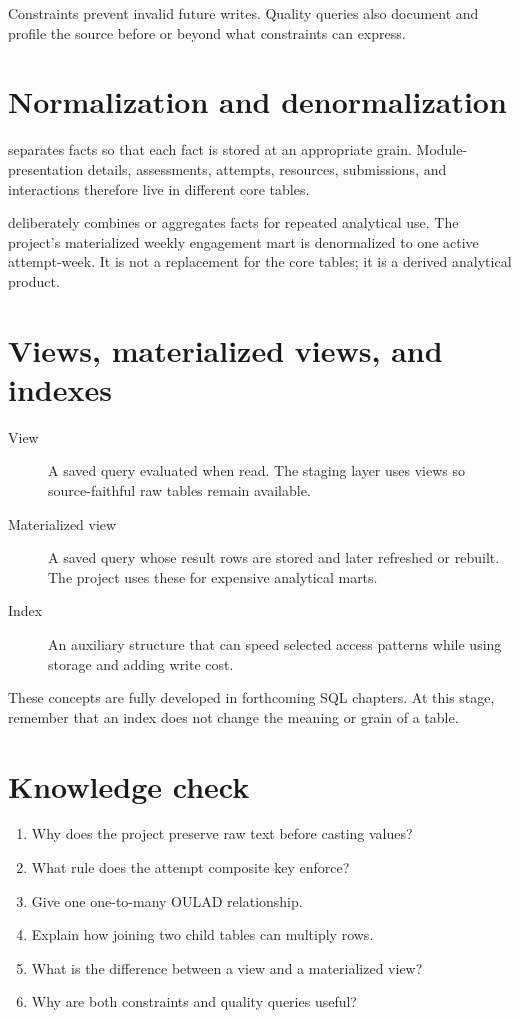 Constraints prevent invalid future writes. Quality queries also document and
profile the source before or beyond what constraints can express.

\section{Normalization and denormalization}

 separates facts so that each fact is stored at an
appropriate grain. Module-presentation details, assessments, attempts,
resources, submissions, and interactions therefore live in different core
tables.

 deliberately combines or aggregates facts for repeated
analytical use. The project's materialized weekly engagement mart is
denormalized to one active attempt-week. It is not a replacement for the core
tables; it is a derived analytical product.

\section{Views, materialized views, and indexes}

\begin{description}
  \item[View] A saved query evaluated when read. The staging layer uses views so
    source-faithful raw tables remain available.
  \item[Materialized view] A saved query whose result rows are stored and later
    refreshed or rebuilt. The project uses these for expensive analytical
    marts.
  \item[Index] An auxiliary structure that can speed selected access patterns
    while using storage and adding write cost.
\end{description}

These concepts are fully developed in forthcoming SQL chapters. At this stage,
remember that an index does not change the meaning or grain of a table.

\section{Knowledge check}

\begin{enumerate}
  \item Why does the project preserve raw text before casting values?
  \item What rule does the attempt composite key enforce?
  \item Give one one-to-many OULAD relationship.
  \item Explain how joining two child tables can multiply rows.
  \item What is the difference between a view and a materialized view?
  \item Why are both constraints and quality queries useful?
\end{enumerate}

